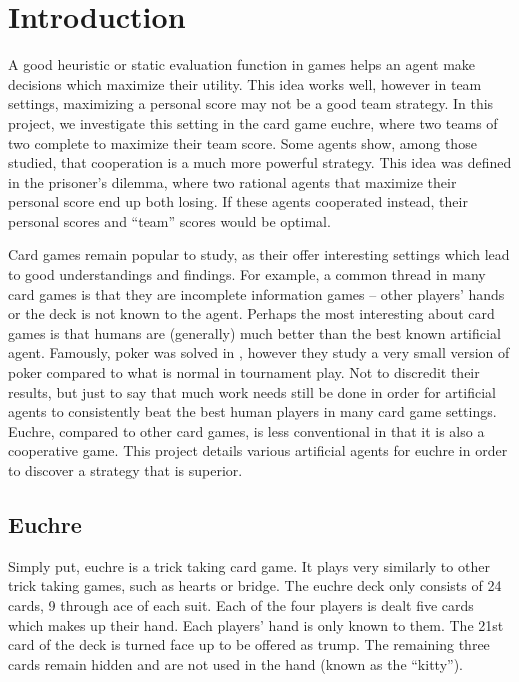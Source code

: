 
\section{Introduction}

A good heuristic or static evaluation function in games helps an agent make decisions which maximize their utility. This idea
works well, however in team settings, maximizing a personal score may not be a good team strategy. In this project, we
investigate this setting in the card game euchre, where two teams of two complete to maximize their team score. Some agents
show, among those studied, that cooperation is a much more powerful strategy. This idea was defined in the prisoner's dilemma, where
two rational agents that maximize their personal score end up both losing. If these agents cooperated instead, their personal scores
and ``team'' scores would be optimal.

Card games remain popular to study, as their offer interesting settings which lead to good understandings and findings. For example,
a common thread in many card games is that they are incomplete information games -- other players' hands or the deck is not known to
the agent. Perhaps the most interesting about card games is that humans are (generally) much better than the best known artificial agent.
Famously, poker was solved in \cite{poker}, however they study a very small version of poker compared to what is normal in tournament play.
Not to discredit their results, but just to say that much work needs still be done in order for artificial agents to consistently beat the
best human players in many card game settings. Euchre, compared to other card games, is less conventional in that it is also a cooperative game.
This project details various artificial agents for euchre in order to discover a strategy that is superior.

\subsection{Euchre}

Simply put, euchre is a trick taking card game. It plays very similarly to other trick taking games, such as hearts or bridge.
The euchre deck only consists of 24 cards, 9 through ace of each suit. Each of the four players is dealt five cards which makes up
their hand. Each players' hand is only known to them. The 21st card of the deck is turned face up to be offered as trump. The remaining
three cards remain hidden and are not used in the hand (known as the ``kitty'').

